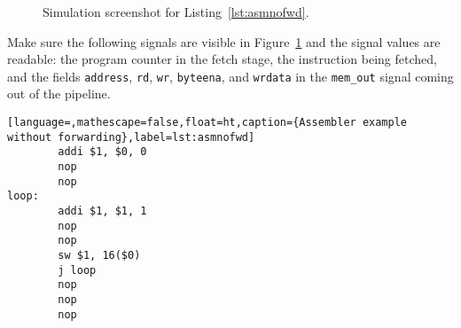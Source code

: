 \documentclass[11pt,a4paper,titlepage,oneside]{article}
\begin{document}
\maketitle


\begin{figure}[ht!]
  \centering
  \caption{Simulation screenshot for Listing~\ref{lst:asmnofwd}.}
  \label{fig:sim}
\end{figure}

Make sure the following signals are visible in Figure~\ref{fig:sim} and the signal values are readable:
the program counter in the fetch stage, the instruction being fetched,
and the fields \texttt{address}, \texttt{rd}, \texttt{wr},
\texttt{byteena}, and \texttt{wrdata} in the \texttt{mem\_out} signal
coming out of the pipeline.

\begin{lstlisting}[language=,mathescape=false,float=ht,caption={Assembler example without forwarding},label=lst:asmnofwd]
        addi $1, $0, 0
        nop
        nop
loop:
        addi $1, $1, 1
        nop
        nop
        sw $1, 16($0)
        j loop
        nop
        nop
        nop
\end{lstlisting}
\end{document}
